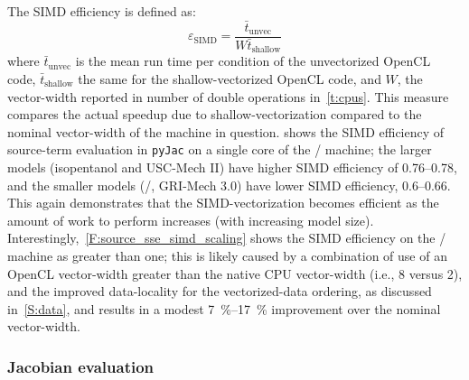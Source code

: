 \documentclass[12pt,number,sort&compress,preprint]{elsarticle}
\begin{document}
The SIMD efficiency is defined as:
\begin{equation}
 \label{e:simd_efficiency}
 \varepsilon_{\text{SIMD}} = \frac{\bar{t}_{\text{unvec}}}{W \bar{t}_{\text{shallow}}}
\end{equation}
where $\bar{t}_{\text{unvec}}$ is the mean run time per condition of the unvectorized OpenCL code, $\bar{t}_{\text{shallow}}$ the same for the shallow-vectorized OpenCL code, and $W$, the vector-width reported in number of double operations in~\cref{t:cpus}.
This measure compares the actual speedup due to shallow-vectorization compared to the nominal vector-width of the machine in question.
 shows the SIMD efficiency of source-term evaluation in \texttt{pyJac} on a single core of the \avx/ machine; the larger models (isopentanol and USC-Mech II) have higher SIMD efficiency of \numrange{0.76}{0.78}, and the smaller models (\slash{}, GRI-Mech \num{3.0}) have lower SIMD efficiency, \numrange{0.6}{0.66}.
This again demonstrates that the SIMD-vectorization becomes efficient as the amount of work to perform increases (with increasing model size).
Interestingly,~\cref{F:source_sse_simd_scaling} shows the SIMD efficiency on the \sse/ machine as greater than one; this is likely caused by a combination of use of an OpenCL vector-width greater than the native CPU vector-width (i.e., \num{8} versus \num{2}), and the improved data-locality for the vectorized-data ordering, as discussed in~\cref{S:data}, and results in a modest \SIrange{7}{17}{\percent} improvement over the nominal vector-width.


\subsubsection{Jacobian evaluation}
\label{S:jacobian_results}
\end{document}
